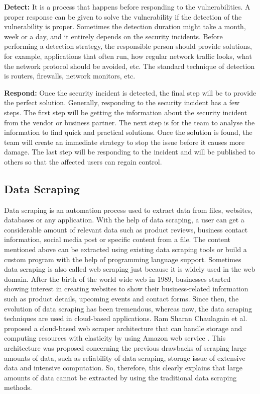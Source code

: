 	\textbf{Detect:} It is a process that happens before responding to the vulnerabilities. A proper response can be given to solve the vulnerability if the detection of the vulnerability is proper. Sometimes the detection duration might take a month, week or a day, and it entirely depends on the security incidents. Before performing a detection strategy, the responsible person should provide solutions, for example, applications that often run, how regular network traffic looks, what the network protocol should be avoided, etc. The standard technique of detection is routers, firewalls, network monitors, etc.
	
	\textbf{Respond:} Once the security incident is detected, the final step will be to provide the perfect solution. Generally, responding to the security incident has a few steps. The first step will be getting the information about the security incident from the vendor or business partner. The next step is for the team to analyse the information to find quick and practical solutions. Once the solution is found, the team will create an immediate strategy to stop the issue before it causes more damage. The last step will be responding to the incident and will be published to others so that the affected users can regain control.

\subsection{Data Scraping}
Data scraping is an automation process used to extract data from files, websites, databases or any application. With the help of data scraping, a user can get a considerable amount of relevant data such as product reviews, business contact information, social media post or specific content from a file. The content mentioned above can be extracted using existing data scraping tools or build a custom program with the help of programming language support. Sometimes data scraping is also called web scraping just because it is widely used in the web domain. After the birth of the world wide web in 1989, businesses started showing interest in creating websites to show their business-related information such as product details, upcoming events and contact forms. Since then, the evolution of data scraping has been tremendous, whereas now, the data scraping techniques are used in cloud-based applications. Ram Sharan Chaulagain et al. proposed a cloud-based web scraper architecture that can handle storage and computing resources with elasticity by using Amazon web service \cite{SaBa2016}. This architecture was proposed concerning the previous drawbacks of scraping large amounts of data, such as reliability of data scraping, storage issue of extensive data and intensive computation. So, therefore, this clearly explains that large amounts of data cannot be extracted by using the traditional data scraping methods.

